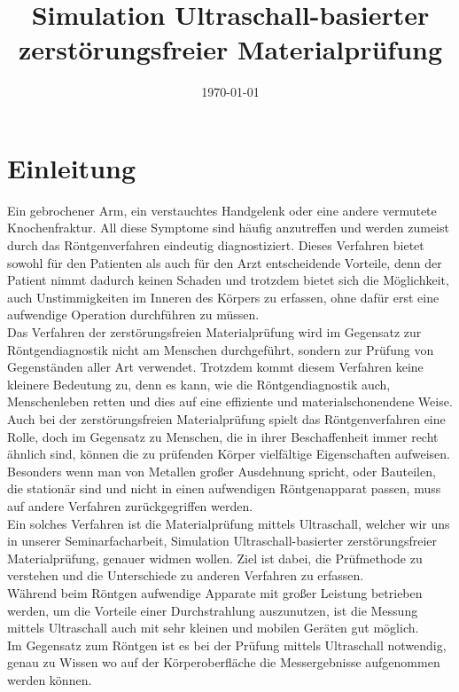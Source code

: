 \documentclass[reducespace,stylepage,semiarbeit]{spezidoc}
\title{Simulation Ultraschall-basierter zerstörungsfreier Materialprüfung}
\date{\today}
\begin{document}
\maketitlepage
\newpage


\tableofcontents
\thispagestyle{empty}
\newpage

\setcounter{page}{1}

\section{Einleitung}
Ein gebrochener Arm, ein verstauchtes Handgelenk oder eine andere vermutete Knochenfraktur. 
All diese Symptome sind häufig anzutreffen und werden zumeist durch das Röntgenverfahren eindeutig diagnostiziert. 
Dieses Verfahren bietet sowohl für den Patienten als auch für den Arzt entscheidende Vorteile, denn der Patient nimmt dadurch keinen Schaden und trotzdem bietet sich die Möglichkeit, auch Unstimmigkeiten im Inneren des Körpers zu erfassen, ohne dafür erst eine aufwendige Operation durchführen zu müssen.\\
Das Verfahren der zerstörungsfreien Materialprüfung wird im Gegensatz zur Röntgendiagnostik nicht am Menschen durchgeführt, sondern zur Prüfung von Gegenständen aller Art verwendet. 
Trotzdem kommt diesem Verfahren keine kleinere Bedeutung zu, denn es kann, wie die Röntgendiagnostik auch, Menschenleben retten und dies auf eine effiziente und materialschonendene Weise.\\ 
Auch bei der zerstörungsfreien Materialprüfung spielt das Röntgenverfahren eine Rolle, doch im Gegensatz zu Menschen, die in ihrer Beschaffenheit immer recht ähnlich sind, können die zu prüfenden Körper vielfältige Eigenschaften aufweisen. 
Besonders wenn man von Metallen großer Ausdehnung spricht, oder Bauteilen, die stationär sind und nicht in einen aufwendigen Röntgenapparat passen, muss auf andere Verfahren zurückgegriffen werden.\\
Ein solches Verfahren ist die Materialprüfung mittels Ultraschall, welcher wir uns in unserer Seminarfacharbeit, \glqq Simulation Ultraschall-basierter zerstörungsfreier Materialprüfung\grqq , genauer widmen wollen. 
Ziel ist dabei, die Prüfmethode zu verstehen und die Unterschiede zu anderen Verfahren zu erfassen.\\
Während beim Röntgen aufwendige Apparate mit großer Leistung betrieben werden, um die Vorteile einer Durchstrahlung auszunutzen, ist die Messung mittels Ultraschall auch mit sehr kleinen und mobilen Geräten gut möglich. \\ 
Im Gegensatz zum Röntgen ist es bei der Prüfung mittels Ultraschall notwendig, genau zu Wissen wo auf der Körperoberfläche die Messergebnisse aufgenommen werden können. 
\end{document}
